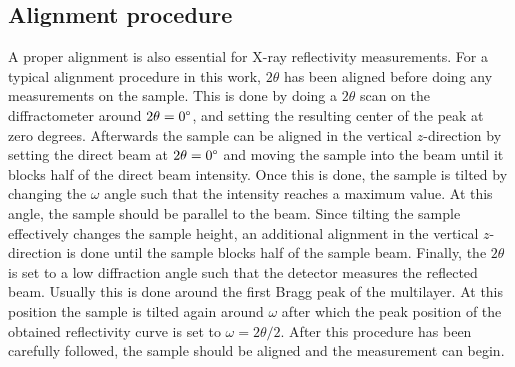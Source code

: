 \subsection{Alignment procedure}
A proper alignment is also essential for X-ray reflectivity measurements. For a typical alignment procedure in this work, $2\theta$ has been aligned before doing any measurements on the sample. This is done by doing a $2\theta$ scan on the diffractometer around $2\theta = 0\degree$, and setting the resulting center of the peak at zero degrees. Afterwards the sample can be aligned in the vertical $z$-direction by setting the direct beam at $2\theta = 0\degree$ and moving the sample into the beam until it blocks half of the direct beam intensity. Once this is done, the sample is tilted by changing the $\omega$ angle such that the intensity reaches a maximum value. At this angle, the sample should be parallel to the beam. Since tilting the sample effectively changes the sample height, an additional alignment in the vertical $z$-direction is done until the sample blocks half of the sample beam. Finally, the $2\theta$ is set to a low diffraction angle such that the detector measures the reflected beam. Usually this is done around the first Bragg peak of the multilayer. At this position the sample is tilted again around $\omega$ after which the peak position of the obtained reflectivity curve is set to $\omega=2\theta/2$. After this procedure has been carefully followed, the sample should be aligned and the measurement can begin.


